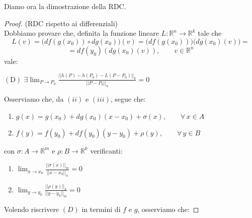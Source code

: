 Diamo ora la dimostrazione della RDC.

\begin{proof}
(RDC rispetto ai differenziali)\\
Dobbiamo provare che, definita la funzione lineare $L : \mathbb{R}^n \longrightarrow \mathbb{R}^k$ tale che
$$
L(v) = \Big( df(g(x_0)) \circ dg(x_0) \Big) (v) = \Big( df(g(x_0)) \Big) \big( dg(x_0)(v) \big) = $$
$$
= df(y_0)(dg(x_0)(v)), \qquad v \in \mathbb{R}^n
$$
vale:
\begin{center}
$\mathrm{(D)}$
\hfill
$\displaystyle \exists \lim_{P \rightarrow P_0} \frac{||h(P)-h(P_0)-L(P-P_0)||_k}{||P-P_0||_n} = 0 $
\hfill \null \\
\end{center}
Osserviamo che, da $(ii)$ e $(iii)$, segue che:
\begin{enumerate}[labelindent=\parindent,leftmargin=*,label=\textnormal{(\arabic*)},start=1]
\item $g(x) = g(x_0) + dg(x_0)(x-x_0) + \sigma(x), \qquad \forall \, x \in A$
\item $f(y) = f(y_0) + df(y_0)(y-y_0) + \rho(y), \qquad \forall \, y \in B$
\end{enumerate}
con $\sigma : A \longrightarrow \mathbb{R}^m$ e $\rho : B \longrightarrow \mathbb{R}^k$ verificanti:
\begin{enumerate}[labelindent=\parindent,leftmargin=*,label=\textnormal{(\arabic*)},start=3]
\item $\displaystyle \lim_{x \rightarrow x_0} \frac{||\sigma(x)||_m}{||x-x_0||_n} = 0$
\item $\displaystyle \lim_{y \rightarrow y_0} \frac{||\rho(y)||_k}{||y-y_0||_m} = 0$
\end{enumerate}
Volendo riscrivere $(D)$ in termini di $f$ e $g$, osserviamo che:
\end{proof}
